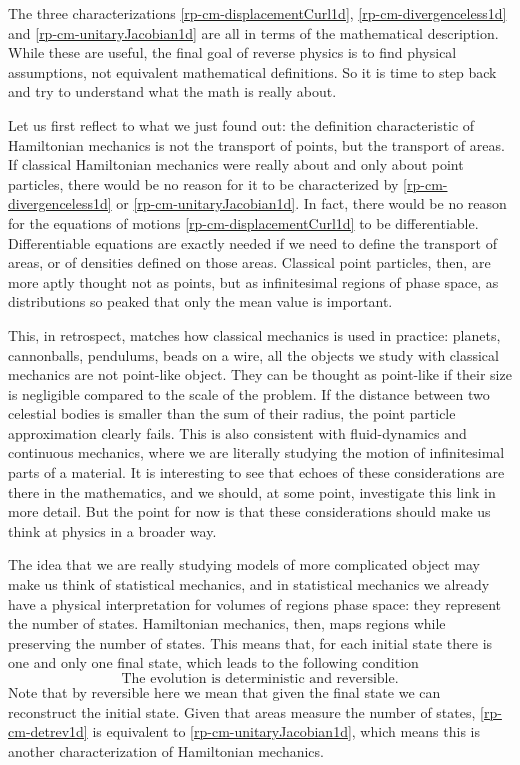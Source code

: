 The three characterizations \ref{rp-cm-displacementCurl1d}, \ref{rp-cm-divergenceless1d} and \ref{rp-cm-unitaryJacobian1d} are all in terms of the mathematical description. While these are useful, the final goal of reverse physics is to find physical assumptions, not equivalent mathematical definitions. So it is time to step back and try to understand what the math is really about.

Let us first reflect to what we just found out: the definition characteristic of Hamiltonian mechanics is not the transport of points, but the transport of areas. If classical Hamiltonian mechanics were really about and only about point particles, there would be no reason for it to be characterized by \ref{rp-cm-divergenceless1d} or \ref{rp-cm-unitaryJacobian1d}. In fact, there would be no reason for the equations of motions \ref{rp-cm-displacementCurl1d} to be differentiable. Differentiable equations are exactly needed if we need to define the transport of areas, or of densities defined on those areas. Classical point particles, then, are more aptly thought not as points, but as infinitesimal regions of phase space, as distributions so peaked that only the mean value is important.

This, in retrospect, matches how classical mechanics is used in practice: planets, cannonballs, pendulums, beads on a wire, all the objects we study with classical mechanics are not point-like object. They can be thought as point-like if their size is negligible compared to the scale of the problem. If the distance between two celestial bodies is smaller than the sum of their radius, the point particle approximation clearly fails. This is also consistent with fluid-dynamics and continuous mechanics, where we are literally studying the motion of infinitesimal parts of a material. It is interesting to see that echoes of these considerations are there in the mathematics, and we should, at some point, investigate this link in more detail. But the point for now is that these considerations should make us think at physics in a broader way.

The idea that we are really studying models of more complicated object may make us think of statistical mechanics, and in statistical mechanics we already have a physical interpretation for volumes of regions phase space: they represent the number of states. Hamiltonian mechanics, then, maps regions while preserving the number of states. This means that, for each initial state there is one and only one final state, which leads to the following condition
\begin{equation}\label{rp-cm-detrev1d}
	\tag{HM-4}
	\text{The evolution is deterministic and reversible.}	
\end{equation}
Note that by reversible here we mean that given the final state we can reconstruct the initial state. Given that areas measure the number of states, \ref{rp-cm-detrev1d} is equivalent to \ref{rp-cm-unitaryJacobian1d}, which means this is another characterization of Hamiltonian mechanics.

